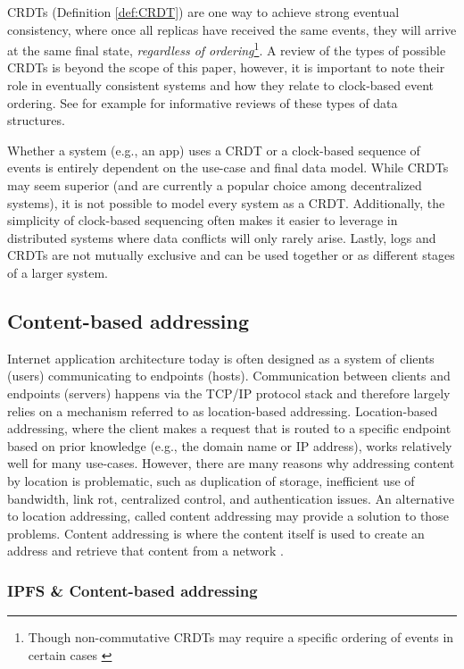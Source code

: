 \documentclass{textile}
\begin{document}
CRDTs (Definition \ref{def:CRDT}) are one way to achieve strong eventual consistency, where once all replicas have received the same events, they will arrive at the same final state, \emph{regardless of ordering}\footnote{Though non-commutative CRDTs may require a specific ordering of events in certain cases \cite{sanjuanMerkleCRDTs2019}}. A review of the types of possible CRDTs is beyond the scope of this paper, however, it is important to note their role in eventually consistent systems and how they relate to clock-based event ordering. See for example \cite{enesSingleWriterPrincipleCRDT2017,sanjuanMerkleCRDTs2019} for informative reviews of these types of data structures.

Whether a system (e.g., an app) uses a CRDT or a clock-based sequence of events is entirely dependent on the use-case and final data model. While CRDTs may seem superior (and are currently a popular choice among decentralized systems), it is not possible to model every system as a CRDT. Additionally, the simplicity of clock-based sequencing often makes it easier to leverage in distributed systems where data conflicts will only rarely arise. Lastly, logs and CRDTs are not mutually exclusive and can be used together or as different stages of a larger system.

\subsection{Content-based addressing}

Internet application architecture today is often designed as a system of clients (users) communicating to endpoints (hosts). Communication between clients and endpoints (servers) happens via the TCP/IP protocol stack and therefore largely relies on a mechanism referred to as location-based addressing. Location-based addressing, where the client makes a request that is routed to a specific endpoint based on prior knowledge (e.g., the domain name or IP address), works relatively well for many use-cases. However, there are many reasons why addressing content by location is problematic, such as duplication of storage, inefficient use of bandwidth, link rot, centralized control, and authentication issues. An alternative to location addressing, called content addressing may provide a solution to those problems. Content addressing is where the content itself is used to create an address and retrieve that content from a network \cite{mortContentBasedAddressing2012}.

\subsubsection{IPFS \& Content-based addressing}
\end{document}
